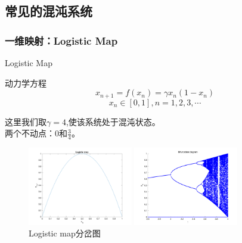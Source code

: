 \documentclass{beamer}
\begin{document}
	\subsection{常见的混沌系统}
		\subsubsection{一维映射：Logistic Map}
		\begin{frame}{Logistic Map}
		\begin{block}{动力学方程}
			$$x_{n+1}=f(x_n)=\gamma x_n(1-x_n)$$
			$$x_n\in [0,1], n=1,2,3,\cdots$$
		\end{block}
		这里我们取$\gamma=4$,使该系统处于混沌状态。\\
		两个不动点：0和$\frac{3}{4}$。
		\begin{figure}
			\begin{minipage}{0.4\linewidth}
				\centering
				\includegraphics[width=1.8in]{figure/logistic_phase}
				\caption{Logistic map相图}
			\end{minipage}
			\begin{minipage}{0.4\linewidth}
				\centering
				\includegraphics[width=1.8in]{figure/logistic_bifurcation}
				\caption{Logistic map分岔图}
			\end{minipage}
		\end{figure}
		\end{frame}
\end{document}
